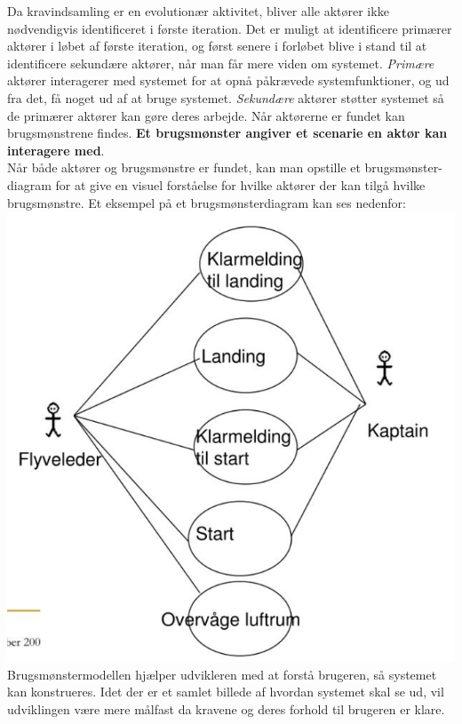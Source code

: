 \noindent
Da kravindsamling er en evolutionær aktivitet, bliver alle aktører ikke nødvendigvis identificeret i første iteration. Det er muligt at identificere primærer aktører i løbet af første iteration, og først senere i forløbet blive i stand til at identificere sekundære aktører, når man får mere viden om systemet. \textit{Primære} aktører interagerer med systemet for at opnå påkrævede systemfunktioner, og ud fra det, få noget ud af at bruge systemet. \textit{Sekundære} aktører støtter systemet så de primærer aktører kan gøre deres arbejde. Når aktørerne er fundet kan brugsmønstrene findes. \textbf{Et brugsmønster angiver et scenarie en aktør kan interagere med}. \\

\noindent
Når både aktører og brugsmønstre er fundet, kan man opstille et brugsmønster-diagram for at give en visuel forståelse for hvilke aktører der kan tilgå hvilke brugsmønstre. Et eksempel på et brugsmønsterdiagram kan ses nedenfor: \\
\includegraphics[scale=1]{figures/2. Faglig vidensgrundlag/UseCaseExample.png} \\

\noindent
Brugsmønstermodellen hjælper udvikleren med at forstå brugeren, så systemet kan konstrueres. Idet der er et samlet billede af hvordan systemet skal se ud, vil udviklingen være mere målfast da kravene og deres forhold til brugeren er klare.

